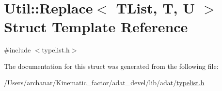 \hypertarget{structUtil_1_1TL_1_1Replace}{}\section{Util\+:\+:Replace$<$ T\+List, T, U $>$ Struct Template Reference}
\label{structUtil_1_1TL_1_1Replace}


{\ttfamily \#include $<$typelist.\+h$>$}



The documentation for this struct was generated from the following file\+:\begin{DoxyCompactItemize}
\item 
/\+Users/archanar/\+Kinematic\+\_\+factor/adat\+\_\+devel/lib/adat/\mbox{\hyperlink{lib_2adat_2typelist_8h}{typelist.\+h}}\end{DoxyCompactItemize}
